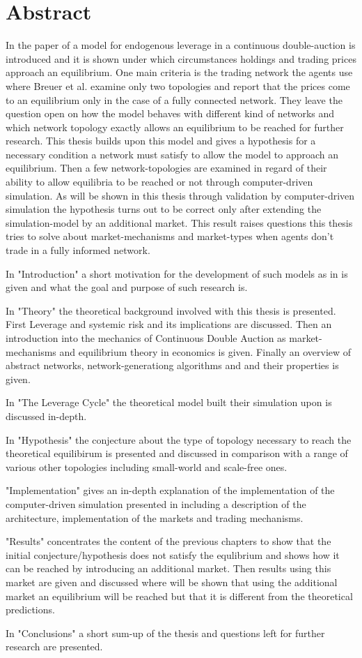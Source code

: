 \documentclass[Bachelorarbeit.tex]{subfiles}
\begin{document}
\chapter*{Abstract}
In the paper of \cite{Breuer2015} a model for endogenous leverage in a continuous double-auction is introduced and it is shown under which circumstances holdings and trading prices approach an equilibrium. One main criteria is the trading network the agents use where Breuer et al. examine only two topologies and report that the prices come to an equilibrium only in the case of a fully connected network. They leave the question open on how the model behaves with different kind of networks and which network topology exactly allows an equilibrium to be reached  for further research. This thesis builds upon this model and gives a hypothesis for a necessary condition a network must satisfy to allow the model to approach an equilibrium. Then a few network-topologies are examined in regard of their ability to allow equilibria to be reached or not through computer-driven simulation. As will be shown in this thesis through validation by computer-driven simulation the hypothesis turns out to be correct only after extending the simulation-model by an additional market. This result raises questions this thesis tries to solve about market-mechanisms and market-types when agents don't trade in a fully informed network. 

In "Introduction" a short motivation for the development of such models as in \cite{Breuer2015} is given and what the goal and purpose of such research is.

In "Theory" the theoretical background involved with this thesis is presented. First Leverage and systemic risk and its implications are discussed. Then an introduction into the mechanics of Continuous Double Auction as market-mechanisms and equilibrium theory in economics is given. Finally an overview of abstract networks, network-generationg algorithms and and their properties is given.

In "The Leverage Cycle" the theoretical model \cite{Breuer2015} built their simulation upon is discussed in-depth.

In "Hypothesis" the conjecture about the type of topology necessary to reach the theoretical equilibirum is presented and discussed in comparison with a range of various other topologies including small-world and scale-free ones.

"Implementation" gives an in-depth explanation of the implementation of the computer-driven simulation presented in \cite{Breuer2015} including a description of the architecture, implementation of the markets and trading mechanisms.

"Results" concentrates the content of the previous chapters to show that the initial conjecture/hypothesis does not satisfy the equlibrium and shows how it can be reached by introducing an additional market. Then results using this market are given and discussed where will be shown that using the additional market an equilibrium will be reached but that it is different from the theoretical predictions.

In "Conclusions" a short sum-up of the thesis and questions left for further research are presented.
\end{document}
